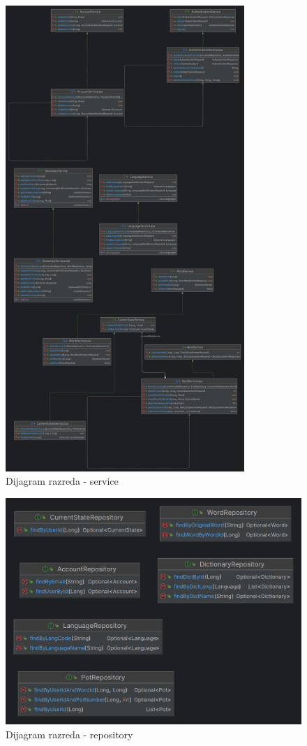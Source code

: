 			\begin{figure}[H]
				\includegraphics[height=500pt]{slike/ClassDiagram2.PNG}
				\caption{Dijagram razreda - service}
				\label{fig:classDiagram2}
			\end{figure}
			
			\begin{figure}[H]
				\includegraphics[width=\textwidth]{slike/ClassDiagram3.PNG}
				\caption{Dijagram razreda - repository}
				\label{fig:classDiagram3}
			\end{figure}
			
